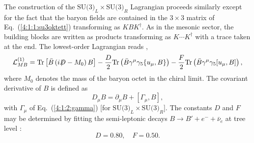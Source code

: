 \documentclass[twoside,12pt]{article}
\begin{document}
   The construction of the $\mbox{SU(3)}_L\times\mbox{SU(3)}_R$ Lagrangian
proceeds similarly except for the fact that the baryon fields are contained
in the $3\times 3$ matrix of Eq.\ (\ref{4:1:1:su3oktett})
transforming as $K B K^\dagger$.
   As in the mesonic sector, the building blocks are written as products
transforming as $K\cdots K^\dagger$ with a trace taken at the end.
   The lowest-order Lagrangian reads \cite{Georgi}, \cite{Krause:1990xc}
\begin{equation}
\label{4:1:2:l1su3}
{\cal L}^{(1)}_{MB}=\mbox{Tr}\left[\bar{B}\left(iD\hspace{-.7em}/\hspace{.2em}
-M_0\right)B\right]
-\frac{D}{2}\mbox{Tr}\left(\bar{B}\gamma^\mu\gamma_5\{u_\mu,B\}\right)
-\frac{F}{2}\mbox{Tr}\left(\bar{B}\gamma^\mu\gamma_5[u_\mu,B]\right),
\end{equation}
where $M_0$ denotes the mass of the baryon octet in the chiral limit.
  The covariant derivative of $B$ is defined as
\begin{equation}
\label{4:1:2:kovderb}
D_\mu B=\partial_\mu B +[\Gamma_\mu,B],
\end{equation}
with $\Gamma_\mu$ of Eq.\ (\ref{4:1:2:gamma}) [for $\mbox{SU(3)}_L\times\mbox{
SU(3)}_R$].
   The constants $D$ and $F$ may be determined by fitting the semi-leptonic
decays $B\to B'+e^-+\bar{\nu}_e$ at tree level \cite{Borasoy:1998pe}:
\begin{equation}
\label{5:2:df}
D=0.80,\quad
F=0.50.
\end{equation}
\end{document}
